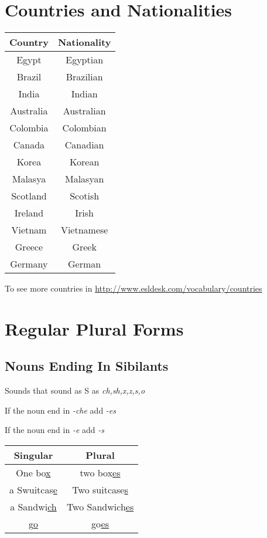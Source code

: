 \documentclass{elegantbook}
\begin{document}
    \section{Countries and Nationalities}
    \begin{tabular}{|c|c|}
        \hline
        \textbf{Country}&\textbf{Nationality}\\
        \hline
        Egypt&Egyptian\\
        \hline
        Brazil&Brazilian\\
        \hline
        India&Indian\\
        \hline
        Australia&Australian\\
        \hline
        Colombia&Colombian\\
        \hline
        Canada&Canadian\\
        \hline
        Korea&Korean\\
        \hline
        Malasya&Malasyan\\
        \hline
        Scotland&Scotish\\
        \hline
        Ireland&Irish\\
        \hline
        Vietnam&Vietnamese\\
        \hline
        Greece&Greek\\
        \hline
        Germany&German\\
        \hline
    \end{tabular}
    \begin{note}
        To see more countries in \url{http://www.esldesk.com/vocabulary/countries}
    \end{note}
    \section{Regular Plural Forms}
    \subsection{Nouns Ending In Sibilants}
    \begin{property}
        Sounds that sound as S as \emph{ch,sh,x,z,s,o}
    \end{property}
    \begin{property}
        If the noun end in \emph{-che} add \emph{-es}
    \end{property}
    \begin{property}
        If the noun end in \emph{-e} add \emph{-s}
    \end{property}
    \begin{center}
        \begin{tabular}{c|c}
            \textbf{Singular}&\textbf{Plural}\\
            \hline
            One bo\underline{x}&two box\underline{es}\\
            a Swuitcas\underline{e}&Two suitcase\underline{s}\\
            a Sandwi\underline{ch}&Two Sandwich\underline{es}\\
            g\underline{o}&go\underline{es}\\
        \end{tabular}
    \end{center}
\end{document}
